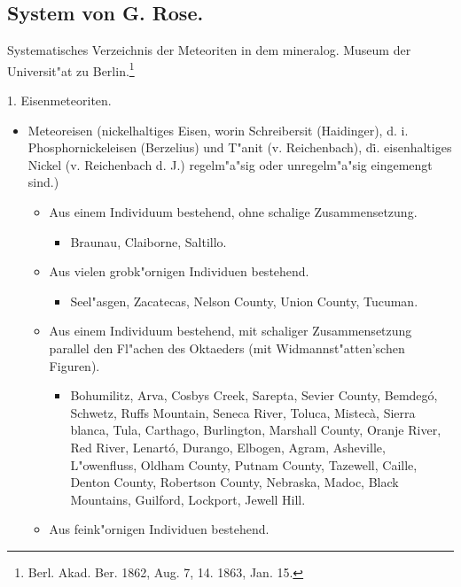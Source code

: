 \documentclass[a4paper, 11pt, oneside]{article}
\begin{document}
\subsection*{System von G. Rose.}
\begin{center}
Systematisches Verzeichnis der Meteoriten in dem mineralog. Museum der Universit"at zu Berlin.\footnote{Berl. Akad. Ber. 1862, Aug. 7, 14. 1863, Jan. 15.}
\end{center}
\begin{center}
1. Eisenmeteoriten.
\end{center}
\begin{itemize}
    \item[1.] Meteoreisen (nickelhaltiges Eisen, worin Schreibersit (Haidinger), d. i. Phosphornickeleisen (Berzelius) und T"anit (v. Reichenbach), d\. i. eisenhaltiges Nickel (v. Reichenbach d. J.) regelm"a"sig oder unregelm"a"sig eingemengt sind.)
    \begin{itemize}
        \item[a.] Aus einem Individuum bestehend, ohne schalige Zusammensetzung.
        \begin{itemize}
            \item Braunau, Claiborne, Saltillo.
        \end{itemize}
        \item[b.] Aus vielen grobk"ornigen Individuen bestehend.
        \begin{itemize}
            \item Seel"asgen, Zacatecas, Nelson County, Union County, Tucuman.
        \end{itemize}
        \item[c.] Aus einem Individuum bestehend, mit schaliger Zusammensetzung parallel den Fl"achen des Oktaeders (mit Widmannst"atten'schen Figuren).
        \begin{itemize}
            \item Bohumilitz, Arva, Cosbys Creek, Sarepta, Sevier County, Bemdegó, Schwetz, Ruffs Mountain, Seneca River, Toluca, Mistecà, Sierra blanca, Tula, Carthago, Burlington, Marshall County, Oranje River, Red River, Lenartó, Durango, Elbogen, Agram, Asheville, L"owenfluss, Oldham County, Putnam County, Tazewell, Caille, Denton County, Robertson County, Nebraska, Madoc, Black Mountains, Guilford, Lockport, Jewell Hill.
        \end{itemize}
        \item[d.] Aus feink"ornigen Individuen bestehend.
        \begin{itemize}

\end{itemize}
\end{itemize}
\end{itemize}
\end{document}
